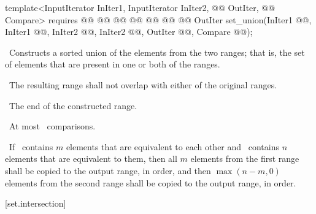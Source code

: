\documentclass[american,twoside]{book}
\begin{document}
\begin{paras}
\begin{itemdecl}
template<InputIterator InIter1, InputIterator InIter2,
         @@ OutIter, 
         @@ Compare>
  requires @@
           @@
        @@
        @@
        @@
        @@
        @@
  OutIter set_union(InIter1 @@, InIter1 @@,
                    InIter2 @@, InIter2 @@,
                    OutIter @@, Compare @@);
\end{itemdecl}\color{black}

\begin{itemdescr}
\pnum
\effects\ 
Constructs a sorted union of the elements from the two ranges;
that is, the set of elements that are present in one or both of the ranges.

\pnum
\requires\ 
The resulting range shall not overlap with either of the original ranges.

\pnum
\returns\ 
The end of the constructed range.

\textcolor{black}{\pnum}
\complexity\ 
At most
\
comparisons.

\pnum
\notes\ If \ contains $m$ elements that are equivalent to
each other and \range{first2}{last2}\ contains $n$ elements that are equivalent
to them, then all $m$ elements from the first range shall be copied to the output
\textcolor{black}{}range, in order, and then $\max(n - m, 0)$ elements from the second range shall
be copied to the output range, in order.
\end{itemdescr}

\rSec3[set.intersection]{\tcode{set_intersection}}


\end{paras}
\end{document}
